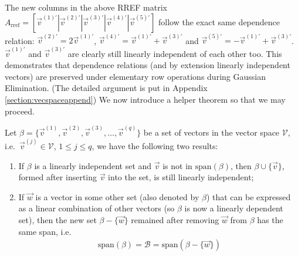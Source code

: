 The new columns in the above RREF matrix $A_{\text{rref}} = [\vec{v}^{(1)'}|\vec{v}^{(2)'}|\vec{v}^{(3)'}|\vec{v}^{(4)'}|\vec{v}^{(5)'}]$ follow the exact same dependence relation: $\vec{v}^{(2)'} = 2\vec{v}^{(1)'}$, $\vec{v}^{(4)'} = \vec{v}^{(1)'} + \vec{v}^{(3)'}$ and $\vec{v}^{(5)'} = -\vec{v}^{(1)'} + \vec{v}^{(3)'}$. $\vec{v}^{(1)'}$ and $\vec{v}^{(3)'}$ are clearly still linearly independent of each other too. This demonstrates that dependence relations (and by extension linearly independent vectors) are preserved under elementary row operations during Gaussian Elimination. (The detailed argument is put in Appendix \ref{section:vecspaceappend}) We now introduce a helper theorem so that we may proceed.
\begin{thm}
\label{thm:plusminus}
Let $\mathcal{\beta} = \{\vec{v}^{(1)}, \vec{v}^{(2)}, \vec{v}^{(3)}, \ldots, \vec{v}^{(q)}\}$ be a set of vectors in the vector space $\mathcal{V}$, i.e.\ $\vec{v}^{(j)} \in \mathcal{V}$, $1 \leq j \leq q$, we have the following two results:
\begin{enumerate}[label=(\alph*)]
    \item If $\mathcal{\beta}$ is a linearly independent set and $\vec{v}$ is not in $\text{span}(\mathcal{\beta})$, then $\mathcal{\beta} \cup \{\vec{v}\}$, formed after inserting $\vec{v}$ into the set, is still linearly independent;
    \item If $\vec{w}$ is a vector in some other set (also denoted by $\mathcal{\beta}$) that can be expressed as a linear combination of other vectors (so $\mathcal{\beta}$ is now a linearly dependent set), then the new set $\mathcal{\beta} - \{\vec{w}\}$ remained after removing $\vec{w}$ from $\mathcal{\beta}$ has the same span, i.e.\
    \begin{align*}
    \text{span}(\mathcal{\beta}) = \mathcal{B} =\text{span}(\mathcal{\beta} - \{\vec{w}\})
    \end{align*}
\end{enumerate}
\end{thm}
